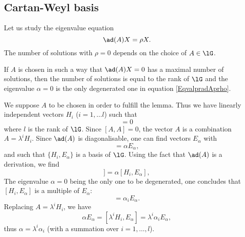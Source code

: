 \subsection{Cartan-Weyl basis}

Let us study the eigenvalue equation
\begin{equation}        \label{EqvalpradAprho}
	\ad(A)X=\rho X.
\end{equation}
The number of solutions with $\rho=0$ depends on the choice of $A\in\lG$.

\begin{lemma}
	If $A$ is chosen in such a way that $\ad(A)X=0$ has a maximal number of solutions, then the number of solutions is equal to the rank of $\lG$ and the eigenvalue $\alpha=0$ is the only degenerated one in equation \eqref{EqvalpradAprho}.
\end{lemma}

We suppose $A$ to be chosen in order to fulfill the lemma. Thus we have linearly independent vectors $H_i$ ($i=1,\ldots l$) such that
\begin{equation}
	[A,H_i]=0
\end{equation}
where $l$ is the rank of $\lG$. Since $[A,A]=0$, the vector $A$ is a combination $A=\lambda^iH_i$. Since $\ad(A)$ is diagonalisable, one can find vectors $E_{\alpha}$ with
\begin{equation}
	[A,E_{\alpha}]=\alpha E_{\alpha},
\end{equation}
and such that $\{ H_i,E_{\alpha} \}$ is a basis of $\lG$. Using the fact that $\ad(A)$ is a derivation, we find
\begin{equation}
	[A,[H_i,E_{\alpha}]]=\alpha[H_i,E_{\alpha}],
\end{equation}
The eigenvalue $\alpha=0$ being the only one to be degenerated, one concludes that $[H_i,E_{\alpha}]$ is a multiple of $E_{\alpha}$:
\begin{equation}
	[H_i,E_{\alpha}]=\alpha_i E_{\alpha}.
\end{equation}
Replacing $A=\lambda^iH_i$, we have
\begin{equation}
	\alpha E_{\alpha}=[\lambda^iH_i,E_{\alpha}]=\lambda^i\alpha_iE_{\alpha},
\end{equation}
thus $\alpha=\lambda^i\alpha_i$ (with a summation over $i=1,\ldots,l$).

